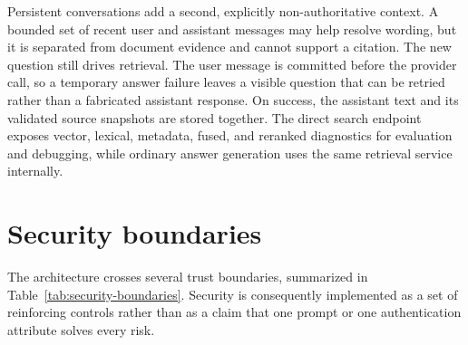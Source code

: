 Persistent conversations add a second, explicitly non-authoritative context.
A bounded set of recent user and assistant messages may help resolve wording,
but it is separated from document evidence and cannot support a citation. The
new question still drives retrieval. The user message is committed before the
provider call, so a temporary answer failure leaves a visible question that can
be retried rather than a fabricated assistant response. On success, the
assistant text and its validated source snapshots are stored together. The
direct search endpoint exposes vector, lexical, metadata, fused, and reranked
diagnostics for evaluation and debugging, while ordinary answer generation
uses the same retrieval service internally.

\section{Security boundaries}
\label{sec:security-boundaries}

The architecture crosses several trust boundaries, summarized in
Table~\ref{tab:security-boundaries}. Security is consequently implemented as a
set of reinforcing controls rather than as a claim that one prompt or one
authentication attribute solves every risk.

